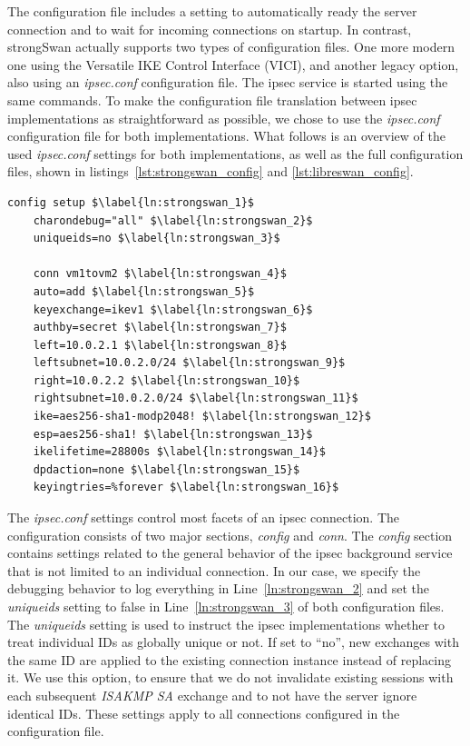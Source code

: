 The configuration file includes a setting to automatically ready the server connection and to wait for incoming connections on startup. In contrast, strongSwan actually supports two types of configuration files. One more modern one using the Versatile IKE Control Interface (VICI), and another legacy option, also using an \emph{ipsec.conf} configuration file. The \ac{ipsec} service is started using the same commands. To make the configuration file translation between \ac{ipsec} implementations as straightforward as possible, we chose to use the \emph{ipsec.conf} configuration file for both implementations. What follows is an overview of the used \emph{ipsec.conf} settings for both implementations, as well as the full configuration files, shown in listings~\ref{lst:strongswan_config} and \ref{lst:libreswan_config}.

\begin{lstlisting}[mathescape=true, float=ht, caption=Configuration options of the strongSwan server., label=lst:strongswan_config]
	config setup $\label{ln:strongswan_1}$
	charondebug="all" $\label{ln:strongswan_2}$
	uniqueids=no $\label{ln:strongswan_3}$
	
	conn vm1tovm2 $\label{ln:strongswan_4}$
	auto=add $\label{ln:strongswan_5}$
	keyexchange=ikev1 $\label{ln:strongswan_6}$
	authby=secret $\label{ln:strongswan_7}$
	left=10.0.2.1 $\label{ln:strongswan_8}$
	leftsubnet=10.0.2.0/24 $\label{ln:strongswan_9}$
	right=10.0.2.2 $\label{ln:strongswan_10}$
	rightsubnet=10.0.2.0/24 $\label{ln:strongswan_11}$
	ike=aes256-sha1-modp2048! $\label{ln:strongswan_12}$
	esp=aes256-sha1! $\label{ln:strongswan_13}$
	ikelifetime=28800s $\label{ln:strongswan_14}$
	dpdaction=none $\label{ln:strongswan_15}$
	keyingtries=%forever $\label{ln:strongswan_16}$
\end{lstlisting}

The \emph{ipsec.conf} settings control most facets of an \ac{ipsec} connection. The configuration consists of two major sections, \emph{config} and \emph{conn}. The \emph{config} section contains settings related to the general behavior of the \ac{ipsec} background service that is not limited to an individual connection. In our case, we specify the debugging behavior to log everything in Line~\ref{ln:strongswan_2} and set the \emph{uniqueids} setting to false in Line~\ref{ln:strongswan_3} of both configuration files. The \emph{uniqueids} setting is used to instruct the \ac{ipsec} implementations whether to treat individual IDs as globally unique or not. If set to ``no'', new exchanges with the same ID are applied to the existing connection instance instead of replacing it. We use this option, to ensure that we do not invalidate existing sessions with each subsequent \emph{ISAKMP SA} exchange and to not have the server ignore identical IDs. These settings apply to all connections configured in the configuration file. \\

